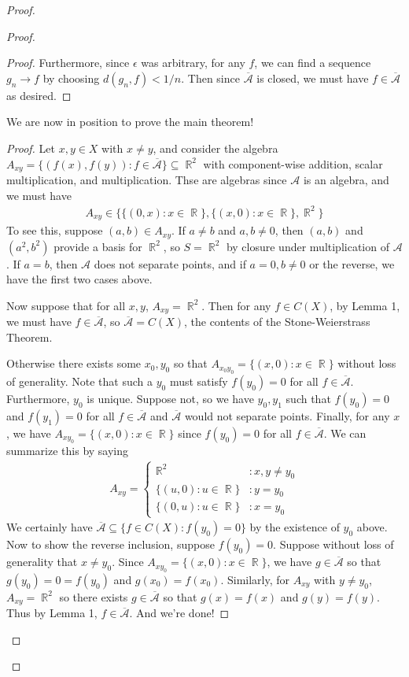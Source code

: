 \documentclass[12pt, a4paper]{book}
\DeclareMathOperator{\R}{\mathbb{R}}
\theoremstyle{nonumberplain}
\newtheorem{proof}{Proof}
\begin{document}
\begin{proof}
\begin{proof}
\begin{proof}
    Furthermore, since $\epsilon$ was arbitrary, for any $f$, we can find a sequence $g_n\to f$ by choosing $d(g_n,f)<1/n$.
    Then since $\overline{\mathcal{A}}$ is closed, we must have $f\in\overline{\mathcal{A}}$ as desired.
\end{proof}
We are now in position to prove the main theorem!
\begin{proof}
    Let $x,y\in X$ with $x\neq y$, and consider the algebra $A_{xy}=\{(f(x),f(y)):f\in \overline{\mathcal{A}}\}\subseteq\R^2$ with component-wise addition, scalar multiplication, and multiplication.
    Thse are algebras since $\mathcal{A}$ is an algebra, and we must have
    \begin{align*}
        A_{xy}\in\{\{(0,x):x\in\R\},\{(x,0):x\in\R\},{\R}^2\}
    \end{align*}
    To see this, suppose $(a,b)\in A_{xy}$.
    If $a\neq b$ and $a,b\neq 0$, then $(a,b)$ and $(a^2,b^2)$ provide a basis for $\R^2$, so $S=\R^2$ by closure under multiplication of $\mathcal{A}$.
    If $a=b$, then $\mathcal{A}$ does not separate points, and if $a=0,b\neq 0$ or the reverse, we have the first two cases above.

    Now suppose that for all $x,y$, $A_{xy}=\R^2$.
    Then for any $f\in C(X)$, by Lemma 1, we must have $f\in\overline{\mathcal{A}}$, so $\overline{\mathcal{A}}=C(X)$, the contents of the Stone-Weierstrass Theorem.

    Otherwise there exists some $x_0,y_0$ so that $A_{x_0y_0}=\{(x,0):x\in\R\}$ without loss of generality.
    Note that such a $y_0$ must satisfy $f(y_0)=0$ for all $f\in\overline{\mathcal{A}}$.
    Furthermore, $y_0$ is unique.
    Suppose not, so we have $y_0,y_1$ such that $f(y_0)=0$ and $f(y_1)=0$ for all $f\in\mathcal{\overline{A}}$ and $\mathcal{\overline{A}}$ would not separate points.
    Finally, for any $x$, we have $A_{xy_0}=\{(x,0):x\in\R\}$ since $f(y_0)=0$ for all $f\in\overline{\mathcal{A}}$.
    We can summarize this by saying
    \begin{align*}
        A_{xy}=\begin{cases}
            {\R}^2 &: x,y\neq y_0\\
            \{(u,0):u\in\R\} &: y=y_0\\
            \{(0,u):u\in\R\} &: x=y_0
        \end{cases}
    \end{align*}
    We certainly have $\overline{\mathcal{A}}\subseteq\{f\in C(X):f(y_0)=0\}$ by the existence of $y_0$ above.
    Now to show the reverse inclusion, suppose $f(y_0)=0$.
    Suppose without loss of generality that $x\neq y_0$.
    Since $A_{xy_0}=\{(x,0):x\in\R\}$, we have $g\in\overline{\mathcal{A}}$ so that $g(y_0)=0=f(y_0)$ and $g(x_0)=f(x_0)$.
    Similarly, for $A_{xy}$ with $y\neq y_0$, $A_{xy}=\R^2$ so there exists $g\in\overline{\mathcal{A}}$ so that $g(x)=f(x)$ and $g(y)=f(y)$.
    Thus by Lemma 1, $f\in\overline{\mathcal{A}}$.
    And we're done!
\end{proof}

\end{proof}
\end{proof}
\end{document}
